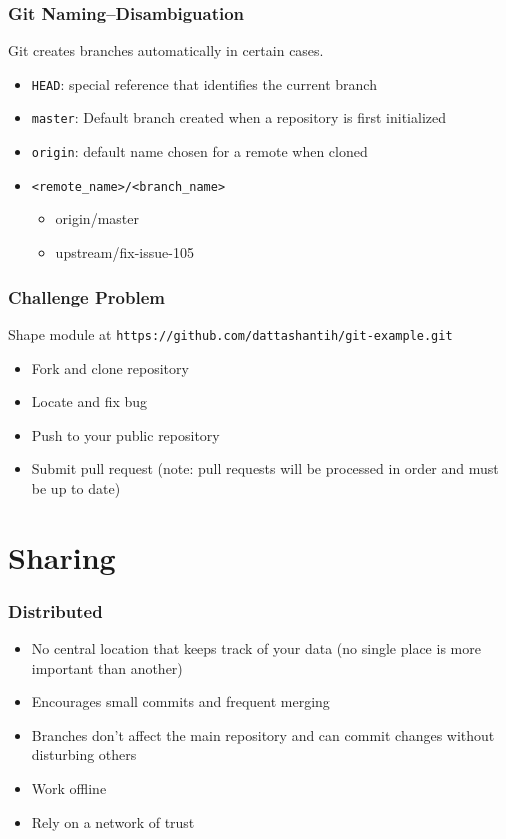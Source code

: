 \documentclass[english,compress]{beamer}
\begin{document}
\begin{frame}[fragile]
    \frametitle{Git Naming--Disambiguation}
    Git creates branches automatically in certain cases.
    \begin{itemize}
        \item \verb|HEAD|: special reference that identifies the current branch
        \item \verb|master|: Default branch created when a repository is first 
            initialized
        \item \verb|origin|: default name chosen for a remote when cloned
        \item \verb|<remote_name>/<branch_name>|
            \begin{itemize}
                \item origin/master
                \item upstream/fix-issue-105
            \end{itemize}
    \end{itemize}
\end{frame}

\begin{frame}[fragile]
    \frametitle{Challenge Problem}

    Shape module at \verb|https://github.com/dattashantih/git-example.git|
    \begin{itemize}
        \item Fork and clone repository
        \item Locate and fix bug
        \item Push to your public repository
        \item Submit pull request (note: pull requests will be processed in 
            order and must be up to date)
    \end{itemize}
\end{frame}

\section{Sharing}
\frame
{
    \frametitle{Distributed}
    \begin{itemize}
        \item No central location that keeps track of your data (no single place is more important than another)
        \item Encourages small commits and frequent merging
        \item Branches don't affect the main repository and can commit changes without disturbing others
        \item Work offline
        \item Rely on a network of trust
    \end{itemize}
}
\end{document}

